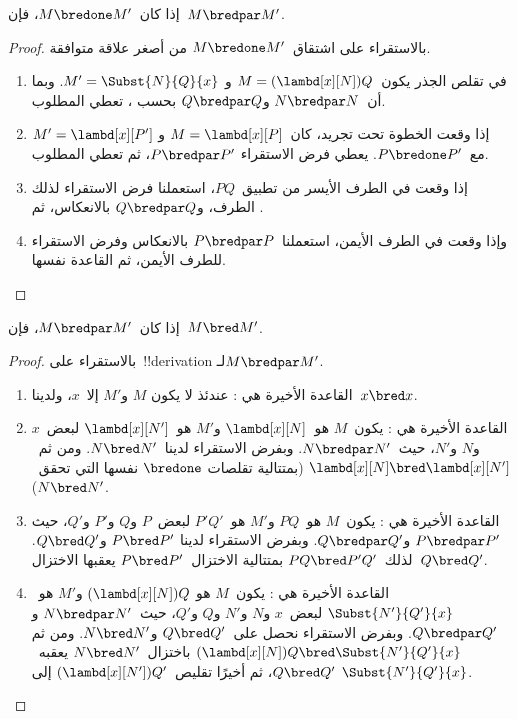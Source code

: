 \documentclass[../../../include/open-logic-section]{subfiles}
\begin{document}


\begin{lem}
  إذا كان~$M \bredone M'$، فإن~$M \bredpar M'$.
\end{lem}
\begin{proof}
  بالاستقراء على اشتقاق~$M \bredone M'$ من أصغر علاقة متوافقة.
  \begin{enumerate}
  \item في تقلص الجذر يكون~$M=(\lambd[x][N])Q$ و
    $M'=\Subst{N}{Q}{x}$. وبما أن~$N\bredpar N$ و$Q\bredpar Q$
    بحسب ، تعطي
     المطلوب.
  \item إذا وقعت الخطوة تحت تجريد، كان~$M=\lambd[x][P]$ و
    $M'=\lambd[x][P']$ مع~$P\bredone P'$. يعطي فرض الاستقراء
    $P\bredpar P'$، ثم تعطي  المطلوب.
  \item إذا وقعت في الطرف الأيسر من تطبيق~$PQ$، استعملنا فرض
    الاستقراء لذلك الطرف، و$Q\bredpar Q$ بالانعكاس، ثم
    .
  \item وإذا وقعت في الطرف الأيمن، استعملنا~$P\bredpar P$
    بالانعكاس وفرض الاستقراء للطرف الأيمن، ثم القاعدة نفسها.
  \end{enumerate}
\end{proof}

\begin{lem}
  إذا كان~$M \bredpar M'$، فإن~$M \bred M'$.
\end{lem}

\begin{proof} بالاستقراء على~!!{derivation} لـ$M \bredpar M'$.
  \begin{enumerate}
  \item القاعدة الأخيرة هي : عندئذ لا يكون
    $M$ و$M'$ إلا~$x$، ولدينا~$x \bred x$.
  \item القاعدة الأخيرة هي : يكون~$M$
    هو~$\lambd[x][N]$ و$M'$ هو~$\lambd[x][N']$ لبعض~$x$ و$N$ و$N'$،
    حيث~$N \bredpar N'$. وبفرض الاستقراء لدينا~$N \bred N'$.
    ومن ثم~$\lambd[x][N] \bred \lambd[x][N']$ (بمتتالية تقلصات
    $\bredone$ نفسها التي تحقق~$N \bred N'$).
  \item القاعدة الأخيرة هي : يكون~$M$ هو~$PQ$
    و$M'$ هو~$P'Q'$ لبعض~$P$ و$Q$ و$P'$ و$Q'$، حيث
    $P \bredpar P'$ و$Q \bredpar Q'$. وبفرض الاستقراء لدينا
    $P \bred P'$ و$Q \bred Q'$. لذلك~$PQ \bred P'Q'$ بمتتالية
    الاختزال~$P \bred P'$ يعقبها الاختزال~$Q \bred Q'$.
  \item القاعدة الأخيرة هي : يكون~$M$ هو
    $(\lambd[x][N])Q$ و$M'$ هو~$\Subst{N'}{Q'}{x}$ لبعض~$x$ و$N$
    و$N'$ و$Q$ و$Q'$، حيث~$N \bredpar N'$ و$Q \bredpar Q'$.
    وبفرض الاستقراء نحصل على~$Q \bred Q'$ و$N \bred N'$. ومن ثم
    $(\lambd[x][N])Q \bred \Subst{N'}{Q'}{x}$ باختزال~$N \bred N'$
    يعقبه~$Q \bred Q'$، ثم أخيرًا تقليص~$(\lambd[x][N'])Q'$ إلى
    $\Subst{N'}{Q'}{x}$.
  \end{enumerate}
\end{proof}
\end{document}
